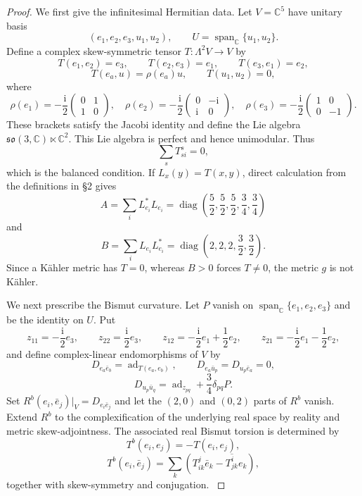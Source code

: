 \documentclass{amsart}
\newcommand{\C}{{\mathbb C}}
\newcommand{\I}{\mathrm{i}}
\begin{document}
\begin{proof}
{We first give the infinitesimal Hermitian data. Let $V=\C^5$ have unitary
basis
}\[
 {(e_1,e_2,e_3,u_1,u_2),\qquad
 U=\operatorname{span}_{\C}\{u_1,u_2\}.
}\]
{Define a complex skew-symmetric tensor $T:\Lambda^2V\to V$ by
}\[
 {T(e_1,e_2)=e_3,\qquad
 T(e_2,e_3)=e_1,\qquad
 T(e_3,e_1)=e_2,
}\]
\[
 {T(e_a,u)=\rho(e_a)u,\qquad T(u_1,u_2)=0,
}\]
{where
}\[
{\rho(e_1)=-\frac{\I}{2}
 \begin{pmatrix}0&1\\1&0\end{pmatrix},\quad
 \rho(e_2)=-\frac{\I}{2}
 \begin{pmatrix}0&-\I\\ \I&0\end{pmatrix},\quad
 \rho(e_3)=-\frac{\I}{2}
 \begin{pmatrix}1&0\\0&-1\end{pmatrix}.
}\]
{These brackets satisfy the Jacobi identity and define the Lie algebra
$\mathfrak{so}(3,\C)\ltimes\C^2$. This Lie algebra is perfect and hence
unimodular. Thus
}\[
{\sum_sT^s_{si}=0,
}\]
{which is the balanced condition. If $L_x(y)=T(x,y)$, direct calculation from
the definitions in }\S 2 {gives
}\[
{A=\sum_iL_{e_i}^*L_{e_i}
 =\operatorname{diag}\left(\frac{5}{2},\frac{5}{2},\frac{5}{2},
                            \frac{3}{4},\frac{3}{4}\right)
}\]
{and
}\[
{B=\sum_iL_{e_i}L_{e_i}^*
 =\operatorname{diag}\left(2,2,2,\frac{3}{2},\frac{3}{2}\right).
}\]
{Since a K\"ahler metric has $T=0$, whereas $B>0$ forces $T\ne0$, the
metric $g$ is not K\"ahler.
}

{We next prescribe the Bismut curvature. Let $P$ vanish on
$\operatorname{span}_{\C}\{e_1,e_2,e_3\}$ and be the identity on $U$. Put
}\[
{z_{11}=-\frac{\I}{2}e_3,\qquad
 z_{22}=\frac{\I}{2}e_3,\qquad
 z_{12}=-\frac{\I}{2}e_1+\frac{1}{2}e_2,\qquad
 z_{21}=-\frac{\I}{2}e_1-\frac{1}{2}e_2,
}\]
{and define complex-linear endomorphisms of $V$ by
}\[
{D_{e_a\bar e_b}=\operatorname{ad}_{T(e_a,e_b)},\qquad
 D_{e_a\bar u_p}=D_{u_p\bar e_a}=0,
}\]
\[
{D_{u_p\bar u_q}
 =\operatorname{ad}_{z_{pq}}+\frac{3}{4}\delta_{pq}P.
}\]
{Set $R^b(e_i,\bar e_j)|_V=D_{e_i\bar e_j}$ and let the $(2,0)$ and
$(0,2)$ parts of $R^b$ vanish. Extend $R^b$ to the complexification of the
underlying real space by reality and metric skew-adjointness. The associated
real Bismut torsion is determined by
}\[
{T^b(e_i,e_j)=-T(e_i,e_j),
}\]
\[
{T^b(e_i,\bar e_j)
 =\sum_k\left(T^j_{ik}\bar e_k-\overline{T^i_{jk}}e_k\right),
}\]
{together with skew-symmetry and conjugation.
}


\end{proof}
\end{document}
